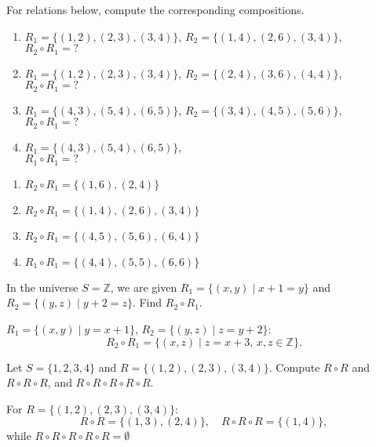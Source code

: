 \documentclass[11pt,paper=b5,footinclude,headinclude]{scrbook} %
\theoremstyle{remark}
\theoremstyle{definition} %
\theoremstyle{theorem} %
\newtheorem{ex}{Exercise\hypertarget{sol:\theex}}[chapter]
\begin{document}
\begin{ex}For relations below, compute the corresponding compositions.
\begin{enumerate}
    \item \(R_1 = \{(1, 2), (2, 3), (3, 4)\}\), \(R_2 = \{(1, 4), (2, 6), (3, 4)\}\),\\ 
    \(R_2 \circ R_1 = ?\)
    \item \(R_1 = \{(1, 2), (2, 3), (3, 4)\}\), \(R_2 = \{(2, 4), (3, 6), (4, 4)\}\), \\
    \(R_2 \circ R_1 = ?\)
    \item \(R_1 = \{(4, 3), (5, 4), (6, 5)\}\), \(R_2 = \{(3, 4), (4, 5), (5, 6)\}\), \\
    \(R_2 \circ R_1 = ?\)
    \item \(R_1 = \{(4, 3), (5, 4), (6, 5)\}\), \\
    \(R_1 \circ R_1 = ?\)
    
\end{enumerate}
\begin{sol}
    \begin{enumerate}
        \item \(R_2 \circ R_1 = \{(1, 6), (2, 4)\}\)
        \item \(R_2 \circ R_1 = \{(1, 4), (2, 6), (3, 4)\}\)
        \item \(R_2 \circ R_1 = \{(4, 5), (5, 6), (6, 4)\}\)
        \item \(R_1 \circ R_1 = \{(4, 4), (5, 5), (6, 6)\}\)
    \end{enumerate}
\end{sol}
\end{ex}

\begin{ex}
    In the universe $S=\mathbb Z$, we are given \(R_1 = \{(x, y) \mid x + 1 = y\}\) and \(R_2 = \{(y, z) \mid y + 2 = z\}\). Find \(R_2 \circ R_1\).

    \begin{sol}
    \(R_1 = \{(x, y) \mid y = x + 1\}\), \(R_2 = \{(y, z) \mid z = y + 2\}\):
    \[
    R_2 \circ R_1 = \{(x, z) \mid z = x + 3, \, x, z \in \mathbb{Z}\}.
    \]
    \end{sol}
\end{ex}
\begin{ex}
    Let \(S = \{1, 2, 3, 4\}\) and \(R = \{(1, 2), (2, 3), (3, 4)\}\). Compute \(R \circ R\) and \(R \circ R \circ R\), and \(R \circ R \circ R \circ R \circ R\).
    \begin{sol}
        For \(R = \{(1, 2), (2, 3), (3, 4)\}\):
    \[
    R \circ R = \{(1, 3), (2, 4)\}, \quad R \circ R \circ R = \{(1, 4)\},
    \]
    while \(R \circ R \circ R \circ R \circ R=\emptyset\)
    \end{sol}
\end{ex}
\end{document}

